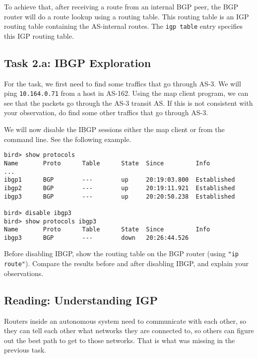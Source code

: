 To achieve that, after receiving a route from an internal BGP peer,
the BGP router will do a route lookup using a routing table.
This routing table is an IGP routing table containing the AS-internal routes. 
The \texttt{igp table} entry specifies this IGP routing table. 



\subsection{Task 2.a: IBGP Exploration} 


For the task, we first need to find some traffics that 
go through AS-3. We will ping \texttt{10.164.0.71} from a host in AS-162. Using the 
map client program, we can see that the packets go through
the AS-3 transit AS. If this is not consistent with your observation,
do find some other traffics that go through AS-3. 

We will now disable the IBGP sessions either the map client or 
from the command line. See the following example.

\begin{lstlisting}
bird> show protocols
Name       Proto      Table      State  Since         Info
...
ibgp1      BGP        ---        up     20:19:03.800  Established
ibgp2      BGP        ---        up     20:19:11.921  Established
ibgp3      BGP        ---        up     20:20:50.238  Established

bird> disable ibgp3 
bird> show protocols ibgp3
Name       Proto      Table      State  Since         Info
ibgp3      BGP        ---        down   20:26:44.526
\end{lstlisting}
 
Before disabling IBGP, show the routing table 
on the BGP router (using \texttt{"ip route"}). Compare the 
results before and after disabling IBGP, and explain
your observations. 


\subsection{Reading: Understanding IGP} 

Routers inside an autonomous system need to
communicate with each other, so they can tell each other
what networks they are connected to, so others can figure out
the best path to get to those networks. That is what
was missing in the previous task.


